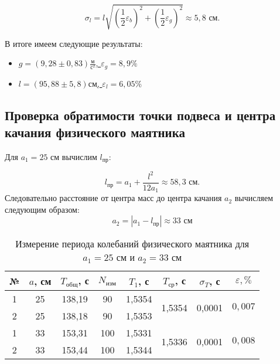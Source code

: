 \documentclass[a4paper,12pt]{article} %
\begin{document}
\begin{equation}
\sigma_l = l\sqrt{\left( \frac{1}{2}\varepsilon_b \right)^2 + \left( \frac{1}{2}\varepsilon_g \right)^2 }\approx 5,8 \text{ см}.
\end{equation}

В итоге имеем следующие результаты:

\begin{itemize}
	\item \underline{$ g = \left( 9,28\pm0,83\right) \frac{\text{м}}{\text{с}^2} $, $ \varepsilon_g=8,9\% $}
	\item \underline{$ l = \left( 95,88\pm5,8\right) \text{см} $, $ \varepsilon_l=6,05\% $}
\end{itemize}

\subsection{Проверка обратимости точки подвеса и центра качания физического маятника}

Для $ a_1 = 25 $ см вычислим $ l_\text{пр} $:

\begin{equation}
l_\text{пр}=a_1+\frac{l^2}{12a_1}\approx 58,3 \text{ см}.
\end{equation}
Следовательно расстояние от центра масс до центра качания $ a_2 $ вычисляем следующим образом:
\begin{equation}
a_2=\left|a_1-l_\text{пр}\right|\approx 33 \text{ см}
\end{equation}

\begin{table}[h!]
	\begin{center}
		\begin{tabular}{|c|c|c|c|c|c|c|c|}
			\hline
			№ & $ a $, см & $ T_\text{общ} $, с & $ N_\text{изм} $ & $ T_1 $, с  & $ T_\text{ср} $, с               & $ \sigma_T $, с                & $ \varepsilon,\% $                \\ \hline
			1 & 25    & 138,19    & 90         & 1,5354 & \multirow{2}{*}{1,5354} & \multirow{2}{*}{0,0001} & \multirow{2}{*}{$ 0,007$} \\ \cline{1-5}
			2 & 25    & 138,18    & 90         & 1,5353 &                         &                         &                              \\ \hline \hline
			1 & 33    & 153,31    & 100        & 1,5331 & \multirow{2}{*}{1,5336} & \multirow{2}{*}{0,0001} & \multirow{2}{*}{$ 0,008$} \\ \cline{1-5}
			2 & 33    & 153,44    & 100        & 1,5344 &                         &                         &                              \\ \hline
		\end{tabular}
	\end{center}
\caption{Измерение периода колебаний физического маятника для $ a_1=25 $ см и $ a_2=33 $ см}\label{tab5}
\end{table}
\end{document}
